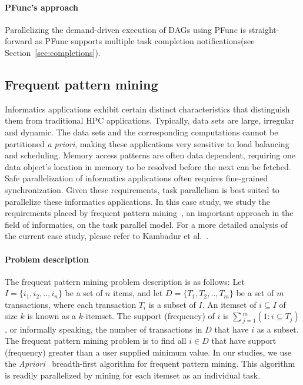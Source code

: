\documentclass{sig-alternate}
\begin{document}
\paragraph{PFunc's approach}
Parallelizing the demand-driven execution of DAGs using PFunc is
straight-forward as PFunc supports multiple task completion notifications(see
Section~\ref{sec:completions}). 


\subsection{Frequent pattern mining}
\label{sec:fim}
Informatics applications exhibit certain distinct characteristics that
distinguish them from traditional HPC applications.  Typically, data sets are
large, irregular and dynamic. The data sets and the corresponding computations
cannot be partitioned \textit{a priori}, making these applications very
sensitive to load balancing and scheduling.  Memory access patterns are often
data dependent, requiring one data object's location in memory to be resolved
before the next can be fetched.  Safe parallelization of informatics
applications often requires fine-grained synchronization.  Given these
requirements, task parallelism is best suited to parallelize these informatics
applications. In this case study, we study the requirements placed by frequent
pattern mining~\cite{Agrawal:1994}, an important approach in the field of
informatics, on the task parallel model. For a more detailed analysis of the
current case study, please refer to Kambadur
et al.~\cite{kambadur09:frequent_pattern_mining}.

\paragraph{Problem description}
The frequent pattern mining problem description is as follows: Let
$I=\{i_{1},i_{2},..,i_{n}\}$ be a set of $n$ items, and let
$D=\{T_{1},T_{2},..,T_{m}\}$  be a set of $m$ transactions, where each
transaction $T_{i}$ is a subset of $I$. An itemset of $i \subseteq{} I$ of size
$k$ is known as a $k$-itemset. The support (frequency) of $i$ is
$\sum{}_{j=1}^{m} (1:i\subseteq{}T_{j})$, or informally speaking, the number of
transactions in $D$ that have $i$ as a subset. The frequent pattern mining
problem is to find all $i \in{} D$ that have support (frequency) greater than a
user supplied minimum value.
In our studies, we use the \textit{Apriori}~\cite{Agrawal:1994:Apriori}
breadth-first algorithm for frequent pattern mining.  This algorithm is readily
parallelized by mining for each itemset as an individual task.
\end{document}
